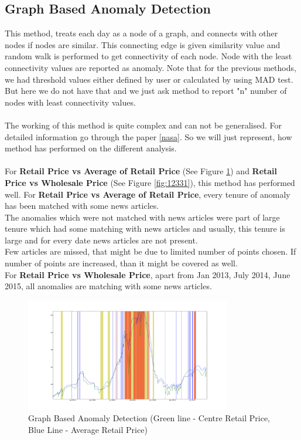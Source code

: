 		
\subsection{Graph Based Anomaly Detection}

	This method, treats each day as a node of a graph, and connects with other nodes if nodes are similar. This connecting edge is given similarity value and random walk is performed to get connectivity of each node. Node with the least connectivity values are reported as anomaly. Note that for the previous methods, we had threshold values either defined by user or calculated by using MAD test. But here we do not have that and we just ask method to report "n" number of nodes with least connectivity values.\\
	\\
	The working of this method is quite complex and can not be generalised. For detailed information go through the paper \ref{nasa}. So we will just represent, how method has performed on the different analysis.\\
	\\
	For \textbf{Retail Price vs Average of Retail Price} (See Figure \ref{fig:1231}) and \textbf{Retail Price vs Wholesale Price} (See Figure \ref{fig:12331}), this method has performed well. For \textbf{Retail Price vs Average of Retail Price}, every tenure of anomaly has been matched with some news articles.
	\\
	The anomalies which were not matched with news articles were part of large tenure which had some matching with news articles and usually, this tenure is large and for every date news articles are not present. 
	\\
	Few articles are missed, that might be due to limited number of points chosen. If number of points are increased, than it might be covered as well. 
	\\
	For \textbf{Retail Price vs Wholesale Price}, apart from Jan 2013, July 2014, June 2015, all anomalies are matching with some news articles.\\
			\begin{figure}[H]
		    	\centering
  		    	\includegraphics[width=0.8\textwidth]{graphs/1231.png}
		    	\caption{Graph Based Anomaly Detection (Green line - Centre Retail Price, Blue Line - Average Retail Price)}
		    	\label{fig:1231}
			\end{figure}
			
